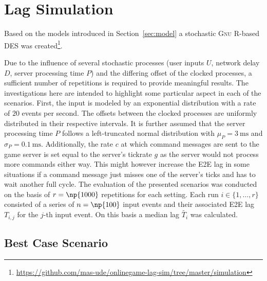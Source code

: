 \section{Lag Simulation}
\label{sec:simulation}

Based on the models introduced in Section~\ref{sec:model} a stochastic \textsc{Gnu R}-based \gls{DES} was created\footnote{\url{https://github.com/mas-ude/onlinegame-lag-sim/tree/master/simulation}}.

Due to the influence of several stochastic processes (user inputs $U$, network delay $D$, server processing time $P$) and the differing offset of the clocked processes, a sufficient number of repetitions is required to provide meaningful results. The investigations here are intended to highlight some particular aspect in each of the scenarios. First, the input is modeled by an exponential distribution with a rate of $20$ events per second. The offsets between the clocked processes are uniformly distributed in their respective intervals. It is further assumed that the server processing time $P$ follows a left-truncated normal distribution with $\mu_P = \SI{3}{\milli\second}$ and $\sigma_P = \SI{0.1}{\milli\second}$. Additionally, the rate $c$ at which command messages are sent to the game server is set equal to the server's tickrate $g$ as the server would not process more commands either way. This might however increase the \gls{E2E} lag in some situations if a command message just misses one of the server's ticks and has to wait another full cycle. The evaluation of the presented scenarios was conducted on the basis of $r=\np{1000}$ repetitions for each setting. Each run $i \in \{1,\dots,r\}$ consisted of a series of $n=\np{100}$ input events and their associated \gls{E2E} lag $T_{i,j}$ for the $j$-th input event. On this basis a median lag $\widetilde{T_i}$ was calculated.


\subsection{Best Case Scenario}


